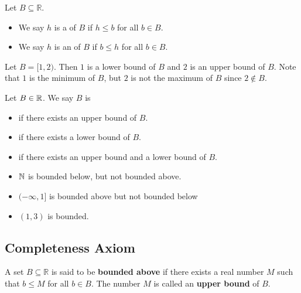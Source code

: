 \documentclass[11pt]{article}
\begin{document}
\begin{definition}
    Let \(B \subseteq \mathbb{R}\).
    \begin{itemize}
        \item We say \(h\) is a  of \(B\) if \(h \leq b\) for all \(b \in
              B\).
        \item We say \(h\) is an  of \(B\) if \(b \leq h\) for all \(b \in
              B\).
    \end{itemize}
\end{definition}
\begin{example}
    Let \(B = [1, 2)\). Then \(1\) is a lower bound of \(B\) and \(2\) is an upper bound of \(B\). Note that \(1\) is the minimum of \(B\), but \(2\) is not the maximum of \(B\) since \(2 \notin B\).
\end{example}
\begin{definition}
    Let \(B \in \mathbb R\). We say \(B\) is \begin{itemize}
        \item {} if there exists an upper bound of \(B\).
        \item {} if there exists a lower bound of \(B\).
        \item {} if there exists an upper bound and a lower bound of \(B\).
    \end{itemize}
\end{definition}
\begin{fact}

\end{fact}
\begin{example}
    \begin{itemize}
        \item \(\mathbb N\) is bounded below, but not bounded above.
        \item \((- \infty, 1]\) is bounded above but not bounded below
        \item \((1, 3)\) is bounded.
    \end{itemize}
\end{example}

\subsection{Completeness Axiom}
\begin{definition}
    A set \(B \subseteq \mathbb{R}\) is said to be \textbf{bounded above} if there exists a real number \(M\) such that \(b \leq M\) for all \(b \in B\). The number \(M\) is called an \textbf{upper bound} of \(B\).
\end{definition}
\end{document}
